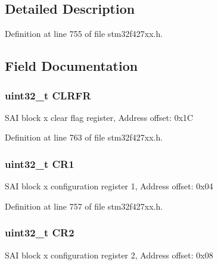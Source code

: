 \subsection{Detailed Description}


Definition at line 755 of file stm32f427xx.\+h.



\subsection{Field Documentation}
\subsubsection[{\texorpdfstring{C\+L\+R\+FR}{CLRFR}}]{ uint32\+\_\+t C\+L\+R\+FR}\hypertarget{struct_s_a_i___block___type_def_aa46ece753867049c7643819478b8330b}{}\label{struct_s_a_i___block___type_def_aa46ece753867049c7643819478b8330b}
S\+AI block x clear flag register, Address offset\+: 0x1C 

Definition at line 763 of file stm32f427xx.\+h.

\subsubsection[{\texorpdfstring{C\+R1}{CR1}}]{ uint32\+\_\+t C\+R1}\hypertarget{struct_s_a_i___block___type_def_ab0ec7102960640751d44e92ddac994f0}{}\label{struct_s_a_i___block___type_def_ab0ec7102960640751d44e92ddac994f0}
S\+AI block x configuration register 1, Address offset\+: 0x04 

Definition at line 757 of file stm32f427xx.\+h.

\subsubsection[{\texorpdfstring{C\+R2}{CR2}}]{ uint32\+\_\+t C\+R2}\hypertarget{struct_s_a_i___block___type_def_afdfa307571967afb1d97943e982b6586}{}\label{struct_s_a_i___block___type_def_afdfa307571967afb1d97943e982b6586}
S\+AI block x configuration register 2, Address offset\+: 0x08 

